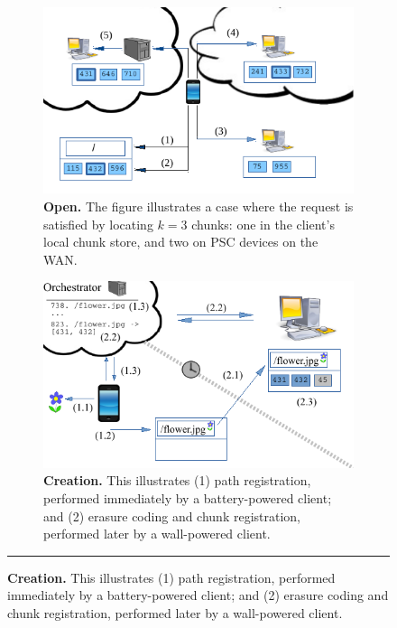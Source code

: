 \begin{figure}[t]

  \begin{subfigure}[t]{0.48\textwidth}

    \includegraphics[width=\textwidth]{./figures/open.pdf}

    \caption{\small \textbf{Open.} The figure illustrates a case where the
      request is satisfied by locating $k = 3$ chunks: one in the client's
    local chunk store, and two on PSC devices on the WAN.}

    \label{fig-design-open}
  \end{subfigure}\hfill
  \begin{subfigure}[t]{0.48\textwidth}

    \includegraphics[width=\textwidth]{./figures/create.pdf}

    \caption{\small \textbf{Creation.} This illustrates (1) path registration,
      performed immediately by a battery-powered client; and (2) erasure coding
    and chunk registration, performed later by a wall-powered client.}

    \label{fig-design-creation}
  \end{subfigure}
  \vspace*{0.05in}

  \hrule

  \vspace*{-0.2in}
\end{figure}


